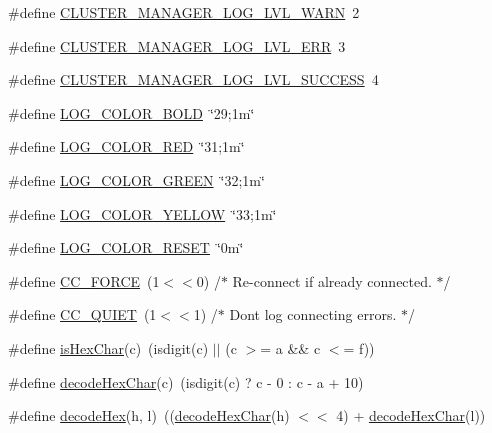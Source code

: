 \begin{DoxyCompactItemize}
\item 
\#define \hyperlink{redis-cli_8c_a75e1edf48f2deecde01c5f5b7a3549c5}{C\+L\+U\+S\+T\+E\+R\+\_\+\+M\+A\+N\+A\+G\+E\+R\+\_\+\+L\+O\+G\+\_\+\+L\+V\+L\+\_\+\+W\+A\+RN}~2
\item 
\#define \hyperlink{redis-cli_8c_af5844c375f96c311eae4a130e2c6faa3}{C\+L\+U\+S\+T\+E\+R\+\_\+\+M\+A\+N\+A\+G\+E\+R\+\_\+\+L\+O\+G\+\_\+\+L\+V\+L\+\_\+\+E\+RR}~3
\item 
\#define \hyperlink{redis-cli_8c_a6a754ca7f60f191d71265d2c35c0cdde}{C\+L\+U\+S\+T\+E\+R\+\_\+\+M\+A\+N\+A\+G\+E\+R\+\_\+\+L\+O\+G\+\_\+\+L\+V\+L\+\_\+\+S\+U\+C\+C\+E\+SS}~4
\item 
\#define \hyperlink{redis-cli_8c_a434346dd26dca0a5bbfe8075307a4c1d}{L\+O\+G\+\_\+\+C\+O\+L\+O\+R\+\_\+\+B\+O\+LD}~\char`\"{}29;1m\char`\"{}
\item 
\#define \hyperlink{redis-cli_8c_af6467cd567c0679c15e09913f77b9555}{L\+O\+G\+\_\+\+C\+O\+L\+O\+R\+\_\+\+R\+ED}~\char`\"{}31;1m\char`\"{}
\item 
\#define \hyperlink{redis-cli_8c_ab3f1028e542649d3ad064ca8b9b123c0}{L\+O\+G\+\_\+\+C\+O\+L\+O\+R\+\_\+\+G\+R\+E\+EN}~\char`\"{}32;1m\char`\"{}
\item 
\#define \hyperlink{redis-cli_8c_a74416ee2437694c75a11e27a158eeb5c}{L\+O\+G\+\_\+\+C\+O\+L\+O\+R\+\_\+\+Y\+E\+L\+L\+OW}~\char`\"{}33;1m\char`\"{}
\item 
\#define \hyperlink{redis-cli_8c_a8878b128231510acd20620de417738e9}{L\+O\+G\+\_\+\+C\+O\+L\+O\+R\+\_\+\+R\+E\+S\+ET}~\char`\"{}0m\char`\"{}
\item 
\#define \hyperlink{redis-cli_8c_a6e13d822283e80732a30dacaa7a4165d}{C\+C\+\_\+\+F\+O\+R\+CE}~(1$<$$<$0)         /$\ast$ Re-\/connect if already connected. $\ast$/
\item 
\#define \hyperlink{redis-cli_8c_ad184832703881443fba3c47f886b51e7}{C\+C\+\_\+\+Q\+U\+I\+ET}~(1$<$$<$1)         /$\ast$ Don\textquotesingle{}t log connecting errors. $\ast$/
\item 
\#define \hyperlink{redis-cli_8c_ab2fbc70c2119ce8e23755a86933af1f5}{is\+Hex\+Char}(c)~(isdigit(c) $\vert$$\vert$ (c $>$= \textquotesingle{}a\textquotesingle{} \&\& c $<$= \textquotesingle{}f\textquotesingle{}))
\item 
\#define \hyperlink{redis-cli_8c_ab610530dccdfe42adbac4677a568645a}{decode\+Hex\+Char}(c)~(isdigit(c) ? c -\/ \textquotesingle{}0\textquotesingle{} \+: c -\/ \textquotesingle{}a\textquotesingle{} + 10)
\item 
\#define \hyperlink{redis-cli_8c_ae03eb95fffcdab7dfa7faeadd04ad9f4}{decode\+Hex}(h,  l)~((\hyperlink{redis-cli_8c_ab610530dccdfe42adbac4677a568645a}{decode\+Hex\+Char}(h) $<$$<$ 4) + \hyperlink{redis-cli_8c_ab610530dccdfe42adbac4677a568645a}{decode\+Hex\+Char}(l))

\end{DoxyCompactItemize}
